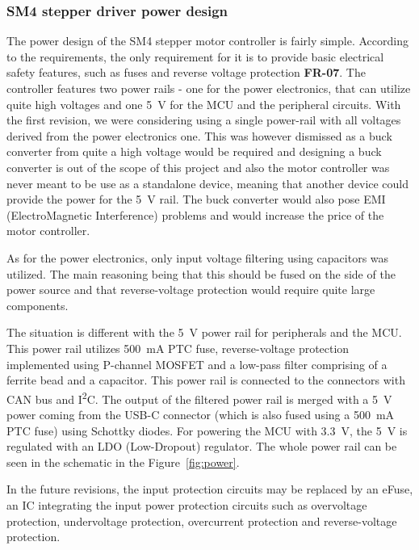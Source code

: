 \subsubsection{SM4 stepper driver power design}
\label{subsubsec:power_design}
The power design of the SM4 stepper motor controller is fairly simple.
According to the requirements, the only requirement for it is to provide basic electrical safety features, such as fuses and reverse voltage protection \textbf{FR-07}.
The controller features two power rails - one for the power electronics, that can utilize quite high voltages and one 5~V for the MCU and the peripheral circuits.
With the first revision, we were considering using a single power-rail with all voltages derived from the power electronics one.
This was however dismissed as a buck converter from quite a high voltage would be required and designing a buck converter is out of the scope of this project and also the motor controller was never meant to be use as a standalone device, meaning that another device could provide the power for the 5~V rail.
The buck converter would also pose EMI (ElectroMagnetic Interference) problems and would increase the price of the motor controller.

As for the power electronics, only input voltage filtering using capacitors was utilized.
The main reasoning being that this should be fused on the side of the power source and that reverse-voltage protection would require quite large components.

The situation is different with the 5~V power rail for peripherals and the MCU.
This power rail utilizes 500~mA PTC fuse, reverse-voltage protection implemented using P-channel MOSFET and a low-pass filter comprising of a ferrite bead and a capacitor.
This power rail is connected to the connectors with CAN bus and I\textsuperscript{2}C.
The output of the filtered power rail is merged with a 5~V power coming from the USB-C connector (which is also fused using a 500~mA PTC fuse) using Schottky diodes.
For powering the MCU with 3.3~V, the 5~V is regulated with an LDO (Low-Dropout) regulator.
The whole power rail can be seen in the schematic in the Figure~\ref{fig:power}.

In the future revisions, the input protection circuits may be replaced by an eFuse\cite{efuse_great_scott}\cite{efuse}, an IC integrating the input power protection circuits such as overvoltage protection, undervoltage protection, overcurrent protection and reverse-voltage protection.

